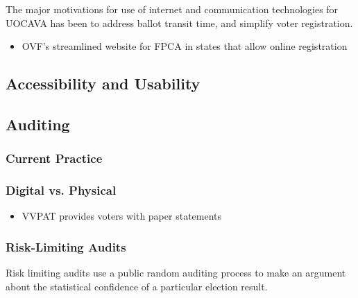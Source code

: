 The major motivations for use of internet and communication technologies for UOCAVA has been to address ballot transit time, and simplify voter registration. 
\begin{itemize}
\item OVF's streamlined website for FPCA in states that allow online registration
\end{itemize}

\subsection{Accessibility and Usability}
\subsection{Auditing}
\subsubsection{Current Practice}
\subsubsection{Digital vs. Physical}
\begin{itemize}
\item VVPAT provides voters with paper statements
\end{itemize}
\subsubsection{Risk-Limiting Audits}
Risk limiting audits use a public random auditing process to make an argument about the statistical confidence of a particular election result.

